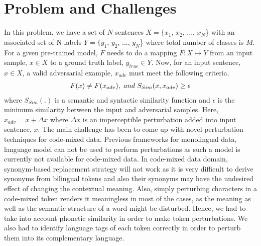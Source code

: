 \documentclass[sigconf]{acmart}
\begin{document}
\section{Problem and Challenges}
In this problem, we have a set of $N$ sentences $X = \{x_{1}$, $x_{2}$, ..., $x_{N}$\} with an associated set of N labels  $Y = \{y_{1}$, $y_{2}$, ..., $y_{N}$\} where total number of classes is $M$. For a given pre-trained model, $F$ needs to do a mapping $F: X \mapsto Y$ from an input sample, $x \in X$ to a ground truth label, $y_{true} \in Y$. Now, for an input sentence, $x \in X$, a valid adversarial example, $x_{adv}$ must meet the following criteria.
\setlength{\belowdisplayskip}{4pt} \setlength{\belowdisplayshortskip}{4pt}
\setlength{\abovedisplayskip}{4pt} \setlength{\abovedisplayshortskip}{4pt}
\begin{align}
\small
    F(x) \neq F(x_{adv}),~and~S_{Sim}(x,x_{adv}) \geq \epsilon
\end{align}
where $S_{Sim}(.)$ is a semantic and syntactic similarity function and $\epsilon$ is the minimum similarity between the input and adversarial samples. Here, $x_{adv} = x + \Delta x$ where $\Delta x$ is an imperceptible perturbation added into input sentence, $x$. 
The main challenge has been to come up with novel perturbation techniques for code-mixed data. Previous frameworks for monolingual data, language model can not be used to perform perturbations as such a model is currently not available for code-mixed data. In code-mixed data domain, synonym-based replacement strategy will not work as it is very difficult to derive synonyms from bilingual tokens and also their synonyms may have the undesired effect of changing the contextual meaning. Also, simply perturbing characters in a code-mixed token renders it meaningless in most of the cases, as the meaning as well as the semantic structure of a word might be disturbed. Hence, we had to take into account phonetic similarity in order to make token perturbations. We also had to identify language tags of each token correctly in order to perturb them into its complementary language.  
\end{document}
